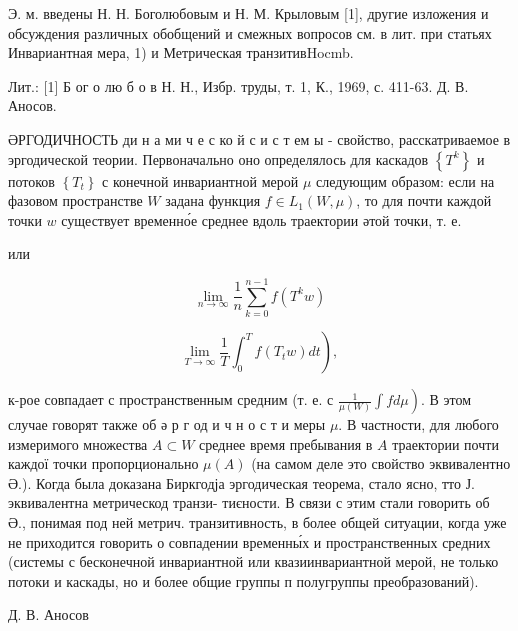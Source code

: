 \documentclass[10pt]{article}
\begin{document}
Э. м. введены Н. Н. Боголюбовым и Н. М. Крыловым [1], другие изложения и обсуждения различных обобщений и смежных вопросов см. в лит. при статьях Инвариантная мера, 1) и Метрическая транзитивHocmb.



Лит.: [1] Б ог о лю б о в Н. Н., Избр. труды, т. 1, К., 1969, с. 411-63. Д. В. Аносов.



ӘРГОДИЧНОСТЬ ди н а ми ч е с ко й с и с т ем ы - свойство, расскатриваемое в эргодической теории. Первоначально оно определялось для каскадов $\left\{T^{k}\right\}$ и потоков $\left\{T_{t}\right\}$ с конечной инвариантной мерой $\mu$ следующим образом: если на фазовом пространстве $W$ задана функция $f \in L_{1}(W, \mu)$, то для почти каждой точки $w$ существует временно́е среднее вдоль траектории әтой точки, т. е.



или



\[

\lim _{n \rightarrow \infty} \frac{1}{n} \sum_{k=0}^{n-1} f\left(T^{k} w\right)

\]



\[

\left.\lim _{T \rightarrow \infty} \frac{1}{T} \int_{0}^{T} f\left(T_{t} w\right) d t\right),

\]



к-рое совпадает с пространственным средним (т. е. с $\left.\frac{1}{\mu(W)} \int f d \mu\right)$. В этом случае говорят также об ә р г од и ч н о с т и меры $\mu$. В частности, для любого измеримого множества $A \subset W$ среднее время пребывания в $A$ траектории почти каждої точки пропорционально $\mu(A)$ (на самом деле это свойство эквивалентно Ә.). Когда была доказана Биркгодја эргодическая теорема, стало ясно, тто Ј. эквивалентна метрическод транзи- тиєности. В связи с этим стали говорить об Ә., понимая под ней метрич. транзитивность, в более общей ситуации, когда уже не приходится говорить о совпадении временны́х и пространственных средних (системы с бесконечной инвариантной или квазиинвариантной мерой, не только потоки и каскады, но и более общие группы п полугруппы преобразований).



Д. В. Аносов
\end{document}
